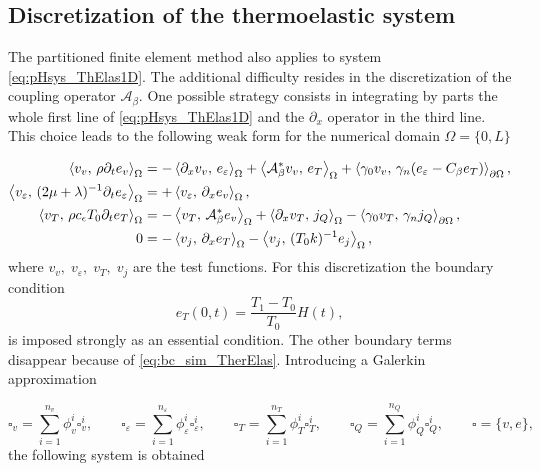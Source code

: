 \subsection{Discretization of the thermoelastic system}
The partitioned finite element method also applies to system \eqref{eq:pHsys_ThElas1D}. The additional difficulty resides in the discretization of the coupling operator $\mathcal{A}_\beta$. One possible strategy consists in integrating by parts the whole first line of \eqref{eq:pHsys_ThElas1D} and the $\partial_x$ operator in the third line. This choice leads to the following weak form for the numerical domain $\Omega = \{0, L\}$

\begin{equation}
	\begin{aligned}
	\inner[\Omega]{v_v}{\rho \partial_t e_v} &= -\inner[\Omega]{\partial_x v_v}{e_{\varepsilon}} +\inner[\Omega]{\mathcal{A}_\beta^* v_v}{e_T} + \inner[\partial\Omega]{\gamma_{0}v_v}{\gamma_{n}(e_\varepsilon - {C}_\beta e_T)}, \\
	\inner[\Omega]{v_\varepsilon}{(2\mu + \lambda)^{-1} \partial_t e_\varepsilon} &= +\inner[\Omega]{v_\varepsilon}{\partial_x e_{v}}, \\
	\inner[\Omega]{v_T}{\rho c_\epsilon T_0  \partial_t e_T} &= -\inner[\Omega]{v_T}{\mathcal{A}_\beta^* e_v} + \inner[\Omega]{\partial_x v_T}{j_Q} -\inner[\partial\Omega]{\gamma_0 v_T}{\gamma_n j_Q}, \\
	0 &= -\inner[\Omega]{v_j}{\partial_x e_T} -\inner[\Omega]{v_j}{(T_0 k)^{-1} e_j},
	\end{aligned}
\end{equation}
where $v_v, \; v_\varepsilon, \; v_T, \; v_j$ are the test functions. For this discretization the boundary condition 
\begin{equation*}
e_T(0, t) = \frac{T_1 - T_0}{T_0} H(t), 
\end{equation*}
is imposed strongly as an essential condition. The other boundary terms disappear because of \eqref{eq:bc_sim_TherElas}. Introducing a Galerkin approximation

\begin{equation}\label{eq:approx_ThermoElas}
\square_v = \sum_{i = 1}^{n_v} \phi_v^i \square_v^i, \qquad
\square_\varepsilon = \sum_{i = 1}^{n_\varepsilon} \phi_\varepsilon^i \square_\varepsilon^i, \qquad
\square_T = \sum_{i = 1}^{n_T} \phi_T^i \square_T^i, \qquad
\square_Q = \sum_{i = 1}^{n_Q} \phi_Q^i \square_Q^i, \qquad \square = \{v, e\},  
\end{equation}  
the following system is obtained

